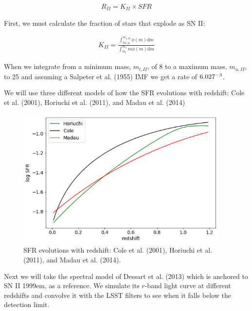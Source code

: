 \documentclass[12pt, onecolumn]{emulateapj}
\begin{document}
\begin{align}
	\label{eq:rateII}
	R_{II} = K_{II} \times SFR
\end{align}

First, we must calculate the fraction of stars that explode as SN II:

\begin{align}
\label{eq:rateII}
K_{II} = \frac{\int_{m_{l,II}}^{m_{u,II}} \phi(m) \mathrm{d}m}{\int_{m_{l}}^{m_{u}} m\phi(m) \mathrm{d}m}
\end{align}

When we integrate from a minimum mass, $m_{l,II}$, of 8 to a maximum mass, $m_{u,II}$, to 25 and assuming a Salpeter et al. (1955) IMF we get a rate of $6.027 \time 10^{-3}$.

We will use three different models of how the SFR evolutions with redshift: Cole et al. (2001), Horiuchi et al. (2011), and Madau et al. (2014)

\begin{figure}
	\begin{center}
		\includegraphics[width=0.95\textwidth]{SNII_SFR.png}
		\caption{SFR evolutions with redshift: Cole et al. (2001), Horiuchi et al. (2011), and Madau et al. (2014).}
		\label{fig:SNII_SFR}
	\end{center}
\end{figure}

Next we will take the spectral model of Dessart et al. (2013) which is anchored to SN II 1999em, as a reference. We simulate its $r$-band light curve at different redshifts and convolve it with the LSST filters to see when it falls below the detection limit.
\end{document}
